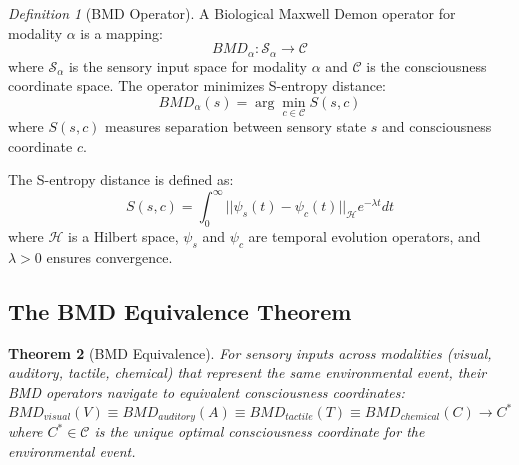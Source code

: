 \documentclass[12pt]{article}
\newtheorem{theorem}{Theorem}[section]
\theoremstyle{definition}
\newtheorem{definition}[theorem]{Definition}
\theoremstyle{remark}
\newtheorem{definition}[theorem]{Definition}
\begin{document}
\begin{definition}[BMD Operator]
\label{def:bmd_operator}
A Biological Maxwell Demon operator for modality $\alpha$ is a mapping:
\begin{equation}
BMD_{\alpha}: \mathcal{S}_{\alpha} \rightarrow \mathcal{C}
\end{equation}
where $\mathcal{S}_{\alpha}$ is the sensory input space for modality $\alpha$ and $\mathcal{C}$ is the consciousness coordinate space. The operator minimizes S-entropy distance:
\begin{equation}
BMD_{\alpha}(s) = \arg\min_{c \in \mathcal{C}} S(s, c)
\end{equation}
where $S(s,c)$ measures separation between sensory state $s$ and consciousness coordinate $c$.
\end{definition}

The S-entropy distance is defined as:
\begin{equation}
\label{eq:s_entropy}
S(s, c) = \int_0^{\infty} ||\psi_s(t) - \psi_c(t)||_{\mathcal{H}} e^{-\lambda t} dt
\end{equation}
where $\mathcal{H}$ is a Hilbert space, $\psi_s$ and $\psi_c$ are temporal evolution operators, and $\lambda > 0$ ensures convergence.

\subsection{The BMD Equivalence Theorem}

\begin{theorem}[BMD Equivalence]
\label{thm:bmd_equivalence}
For sensory inputs across modalities (visual, auditory, tactile, chemical) that represent the same environmental event, their BMD operators navigate to equivalent consciousness coordinates:
\begin{equation}
BMD_{visual}(V) \equiv BMD_{auditory}(A) \equiv BMD_{tactile}(T) \equiv BMD_{chemical}(C) \rightarrow C^*
\end{equation}
where $C^* \in \mathcal{C}$ is the unique optimal consciousness coordinate for the environmental event.
\end{theorem}
\end{document}
